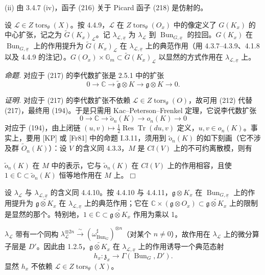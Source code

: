 (ii) 由 3.4.7 (iv)，函子 (216) 关于 Picard 函子 (218) 是仿射的。

 设 $\mathcal{L}\in Z\operatorname{tors}_{\theta}(X)$。按 4.4.9，$\mathcal{L}$ 在 $Z\operatorname{tors}_{\theta}(O_{x})$ 中的像定义了 $G(K_{x})$ 的中心扩张，记之为 $\tilde{G}(K_{x})_{\mathcal{L}}$。记 $\lambda_{\mathcal{L},\underline{x}}$ 为 $\lambda_{\mathcal{L}}$ 到 $\operatorname{Bun}_{G,\underline{x}}$ 的拉回。$G(K_{x})$ 在 $\operatorname{Bun}_{G,\underline{x}}$ 上的作用提升为 $\tilde{G}(K_{x})_{\mathcal{L}}$ 在 $\lambda_{\mathcal{L},\underline{x}}$ 上的典范作用（用 4.3.7–4.3.9、4.1.8 以及 4.4.9 的注记）。$G(O_{x})\times\mathbb{G}_{m}\subset\tilde{G}(K_{x})_{\mathcal{L}}$ 以显然的方式作用在 $\lambda_{\mathcal{L},\underline{x}}$ 上。

 \emph{命题.} 对应于 (217) 的李代数扩张是 2.5.1 中的扩张
\[
0\to\mathbb{C}\to\widetilde{\mathfrak{g}}\otimes K\to\mathfrak{g}\otimes K\to 0.
\]

\emph{证明.} 对应于 (217) 的李代数扩张不依赖 $\mathcal{L}\in Z\operatorname{tors}_{\theta}(O)$，故可用 (212) 代替 (217)，最终用 (194)。于是只需用 Kac–Peterson–Frenkel 定理，它说李代数扩张
\begin{equation}\tag{220}
0\to\mathbb{C}\to\tilde{o}_{n}(K)\to o_{n}(K)\to 0
\end{equation}
对应于 (194)，由上闭链 $(u,v)\mapsto\frac{1}{2}\operatorname{Res}\operatorname{Tr}(du,v)$ 定义，$u,v\in o_{n}(K)$。事实上，要用 [KP] 或 [Fr81] 中的命题 I.3.11，须用到 $\tilde{o}_{n}(K)$ 的如下刻画（它不涉及群 $\tilde{O}_{n}(K)$）：设 $V$ 的含义同 4.3.3，$M$ 是 $Cl(V)$ 上的不可约离散模，则有


$\tilde{o}_{n}(K)$ 在 $M$ 中的表示，它与 $\tilde{o}_{n}(K)$ 在 $Cl(V)$ 上的作用相容，且使 $1\in\mathbb{C}\subset\tilde{o}_{n}(K)$ 恒等地作用在 $M$ 上。\hfill$\Box$

 设 $\lambda_{\mathcal{L}}$ 与 $\lambda_{\mathcal{L},\underline{x}}$ 的含义同 4.4.10。按 4.4.10 与 4.4.11，$\mathfrak{g}\otimes K_{x}$ 在 $\operatorname{Bun}_{G,\underline{x}}$ 上的作用提升为 $\widetilde{\mathfrak{g}\otimes K_{x}}$ 在 $\lambda_{\mathcal{L},\underline{x}}$ 上的典范作用；它在 $\mathbb{C}\times(\mathfrak{g}\otimes O_{x})\subset\widetilde{\mathfrak{g}\otimes K_{x}}$ 上的限制是显然的那个。特别地，$1\in\mathbb{C}\subset\widetilde{\mathfrak{g}\otimes K_{x}}$ 作用为乘以 1。

$\lambda_{\mathcal{L}}$ 带有一个同构 $\lambda_{\mathcal{L}}^{\otimes 2n}\xrightarrow{\ \sim\ }(\omega^{\sharp}_{\operatorname{Bun}_{G}})^{\otimes n}$（对某个 $n\ne 0$），故作用在 $\lambda_{\mathcal{L}}$ 上的微分算子层是 $D'$。因此由 1.2.5，$\widetilde{\mathfrak{g}\otimes K_{x}}$ 在 $\lambda_{\mathcal{L},\underline{x}}$ 上的作用诱导一个典范态射
\[
h_{x}:\mathfrak{z}_{x}\to\Gamma(\operatorname{Bun}_{G},D').
\]
显然 $h_{x}$ 不依赖 $\mathcal{L}\in Z\operatorname{tors}_{\theta}(X)$。

